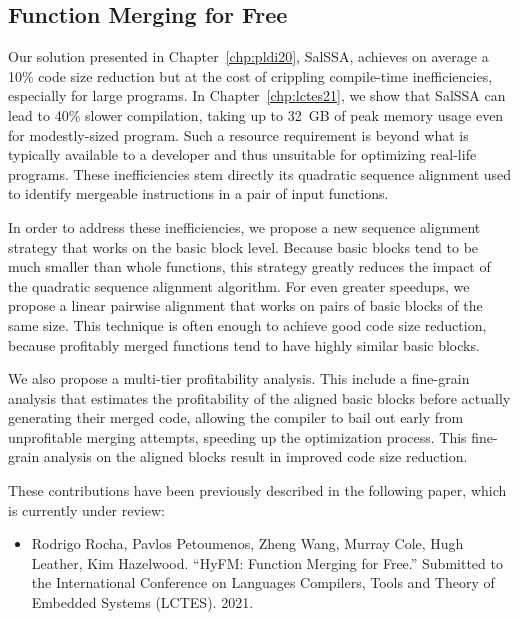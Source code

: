 \subsection{Function Merging for Free}


Our solution presented in Chapter~\ref{chp:pldi20}, SalSSA, achieves on average a 10\% code size reduction but at the cost of crippling compile-time inefficiencies, especially for large programs.
In Chapter~\ref{chp:lctes21}, we show that SalSSA can lead to 40\% slower compilation, taking up to 32~GB of peak memory usage even for modestly-sized program.
Such a resource requirement is beyond what is typically available to a developer and thus unsuitable for optimizing real-life programs.
These inefficiencies stem directly its quadratic sequence alignment used to identify mergeable instructions in a pair of input functions.

In order to address these inefficiencies, we propose a new sequence alignment strategy that works on the basic block level.
Because basic blocks tend to  be much smaller than whole functions, this strategy greatly reduces the impact of the quadratic sequence alignment algorithm.
For even greater speedups, we propose a linear pairwise alignment that works on pairs of basic blocks of the same size. 
This technique is often enough to achieve good code size reduction, because profitably merged functions tend to have highly similar basic blocks.

We also propose a multi-tier profitability analysis.
This include a fine-grain analysis that estimates the profitability of the aligned basic blocks before actually generating their merged code,
allowing the compiler to bail out early from unprofitable merging attempts, speeding up the optimization process.
This fine-grain analysis on the aligned blocks result in improved code size reduction.

These contributions have been previously described in the following paper, which is currently under review:
\begin{itemize}
\item Rodrigo Rocha, Pavlos Petoumenos, Zheng Wang, Murray Cole, Hugh Leather, Kim Hazelwood. ``HyFM: Function Merging for Free.'' Submitted to the International Conference on Languages Compilers, Tools and Theory of Embedded Systems (LCTES). 2021.
\end{itemize}

